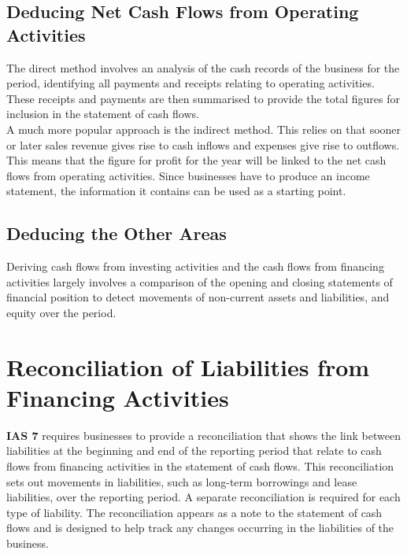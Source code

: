 \documentclass{report}
\begin{document}
\subsection{Deducing Net Cash Flows from Operating Activities}
The direct method involves an analysis of the cash records of the business for the period, identifying all payments and receipts relating to operating activities. These receipts and payments are then summarised to provide the total figures for inclusion in the statement of cash flows.\\

A much more popular approach is the indirect method. This relies on that sooner or later sales revenue gives rise to cash inflows and expenses give rise to outflows. This means that the figure for profit for the year will be linked to the net cash flows from operating activities. Since businesses have to produce an income statement, the information it contains can be used as a starting point.

\subsection{Deducing the Other Areas}
Deriving cash flows from investing activities and the cash flows from financing activities largely involves a comparison of the opening and closing statements of financial position to detect movements of non-current assets and liabilities, and equity over the period.

\section{Reconciliation of Liabilities from Financing Activities}

\textbf{IAS 7} requires businesses to provide a reconciliation that shows the link between liabilities at the beginning and end of the reporting period that relate to cash flows from financing activities in the statement of cash flows. This reconciliation sets out movements in liabilities, such as long-term borrowings and lease liabilities, over the reporting period. A separate reconciliation is required for each type of liability. The reconciliation appears as a note to the statement of cash flows and is designed to help track any changes occurring in the liabilities of the business.

\end{document}
